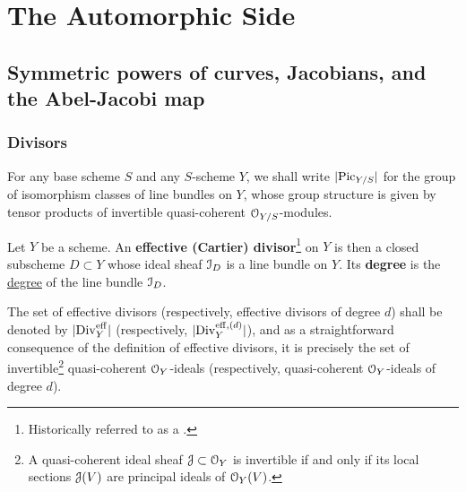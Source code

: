 \section{The Automorphic Side}
    \subsection{Symmetric powers of curves, Jacobians, and the Abel-Jacobi map}
        \subsubsection{Divisors}
            \begin{convention} \label{conv: picard_group}
                For any base scheme $S$ and any $S$-scheme $Y$, we shall write $|\mathrm{Pic}_{Y/S}|$ for the group of isomorphism classes of line bundles on $Y$, whose group structure is given by tensor products of invertible quasi-coherent $\mathcal{O}_{Y/S}$-modules.
            \end{convention}
            \begin{definition}[Divisors] \label{def: divisors}
                Let $Y$ be a scheme. An \textbf{effective (Cartier) divisor}\footnote{Historically referred to as a .} on $Y$ is then a closed subscheme $D \subset Y$ whose ideal sheaf $\mathcal{I}_D$ is a line bundle on $Y$. Its \textbf{degree} is the \href{https://stacks.math.columbia.edu/tag/0AYQ}{\underline{degree}} of the line bundle $\mathcal{I}_D$.  
                    
                The set of effective divisors (respectively, effective divisors of degree $d$) shall be denoted by $|\mathrm{Div}_Y^{\mathrm{eff}}|$ (respectively, $|\mathrm{Div}_Y^{\mathrm{eff}, (d)}|$), and as a straightforward consequence of the definition of effective divisors, it is precisely the set of invertible\footnote{A quasi-coherent ideal sheaf $\mathcal{J} \subset \mathcal{O}_Y$ is invertible if and only if its local sections $\mathcal{J}(V)$ are principal ideals of $\mathcal{O}_Y(V)$.} quasi-coherent $\mathcal{O}_Y$-ideals (respectively, quasi-coherent $\mathcal{O}_Y$-ideals of degree $d$).
            \end{definition}
